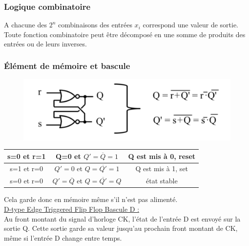 \documentclass[../main.tex]{subfiles}
\begin{document}
\subsubsection{Logique combinatoire}
A chacune des $2^n$ combinaisons des entrées $x_i$ correspond une valeur de sortie. \\
Toute fonction combinatoire peut être décomposé en une somme de produits des entrées ou de leurs inverses.\\

\subsubsection{Élément de mémoire et bascule}

\begin{figure}[hbt!]
    \centering
    \includegraphics[width=.6\textwidth]{IMAGES/elec/IMG_0156.jpeg}
\end{figure}

\begin{table}[hbt!]
    \centering
    \begin{tabular}{c|c|c}
       s=0 et r=1  & Q=0 et $Q'=\overline{Q} =1$ & Q est mis à 0, reset \\ \hline
        s=1 et r=0 & $Q'=0$ et $Q = \overline{Q'}=1$ & Q est mis à 1, set\\ \hline
        s=0 et r=0 & $Q'= \overline{Q}$ et $Q = \overline{Q'}=Q$ & état stable\\
    \end{tabular}
\end{table}

Cela garde donc en mémoire même s'il n'est pas alimenté.\\

\quad \underline{D-type Edge Triggered Flip Flop Bascule D :}\\

Au front montant du signal d'horloge CK, l'état de l'entrée D est envoyé sur la sortie Q. Cette sortie garde sa valeur jusqu'au prochain front montant de CK, même si l'entrée D change entre temps.\\
\end{document}
